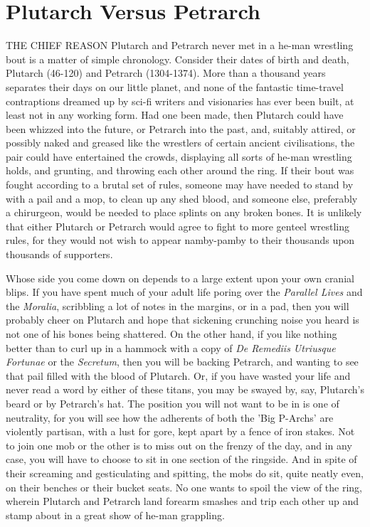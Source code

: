 \chapter{Plutarch Versus Petrarch}

THE CHIEF REASON Plutarch and Petrarch never met in a he-man wrestling bout is a matter of simple chronology. Consider their dates of birth and death, Plutarch (46-120) and Petrarch (1304-1374). More than a thousand years separates their days on our little planet, and none of the fantastic time-travel contraptions dreamed up by sci-fi writers and visionaries has ever been built, at least not in any working form. Had one been made, then Plutarch could have been whizzed into the future, or Petrarch into the past, and, suitably attired, or possibly naked and greased like the wrestlers of certain ancient civilisations, the pair could have entertained the crowds, displaying all sorts of he-man wrestling holds, and grunting, and throwing each other around the ring. If their bout was fought according to a brutal set of rules, someone may have needed to stand by with a pail and a mop, to clean up any shed blood, and someone else, preferably a chirurgeon, would be needed to place splints on any broken bones. It is unlikely that either Plutarch or Petrarch would agree to fight to more genteel wrestling rules, for they would not wish to appear namby-pamby to their thousands upon thousands of supporters.

Whose side you come down on depends to a large extent upon your own cranial blips. If you have spent much of your adult life poring over the \emph{Parallel Lives} and the \emph{Moralia}, scribbling a lot of notes in the margins, or in a pad, then you will probably cheer on Plutarch and hope that sickening crunching noise you heard is not one of his bones being shattered. On the other hand, if you like nothing better than to curl up in a hammock with a copy of \emph{De Remediis Utriusque Fortunae} or the \emph{Secretum}, then you will be backing Petrarch, and wanting to see that pail filled with the blood of Plutarch. Or, if you have wasted your life and never read a word by either of these titans, you may be swayed by, say, Plutarch's beard or by Petrarch's hat. The position you will not want to be in is one of neutrality, for you will see how the adherents of both the 'Big P-Archs' are violently partisan, with a lust for gore, kept apart by a fence of iron stakes. Not to join one mob or the other is to miss out on the frenzy of the day, and in any case, you will have to choose to sit in one section of the ringside. And in spite of their screaming and gesticulating and spitting, the mobs do sit, quite neatly even, on their benches or their bucket seats. No one wants to spoil the view of the ring, wherein Plutarch and Petrarch land forearm smashes and trip each other up and stamp about in a great show of he-man grappling.

